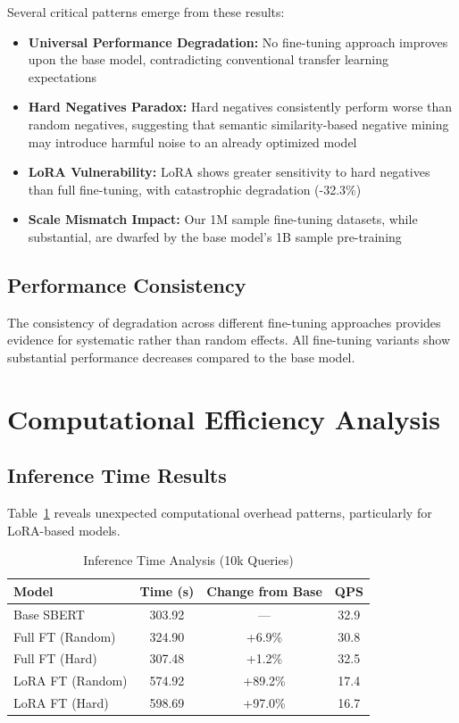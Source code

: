 Several critical patterns emerge from these results:

\begin{itemize}
\item \textbf{Universal Performance Degradation:} No fine-tuning approach improves upon the base model, contradicting conventional transfer learning expectations
\item \textbf{Hard Negatives Paradox:} Hard negatives consistently perform worse than random negatives, suggesting that semantic similarity-based negative mining may introduce harmful noise to an already optimized model
\item \textbf{LoRA Vulnerability:} LoRA shows greater sensitivity to hard negatives than full fine-tuning, with catastrophic degradation (-32.3\%)
\item \textbf{Scale Mismatch Impact:} Our 1M sample fine-tuning datasets, while substantial, are dwarfed by the base model's 1B sample pre-training
\end{itemize}

\subsection{Performance Consistency}

The consistency of degradation across different fine-tuning approaches provides evidence for systematic rather than random effects. All fine-tuning variants show substantial performance decreases compared to the base model.

\section{Computational Efficiency Analysis}

\subsection{Inference Time Results}

Table~\ref{tab:inference_detailed_thesis} reveals unexpected computational overhead patterns, particularly for LoRA-based models.

\begin{table}[h]
\centering
\caption{Inference Time Analysis (10k Queries)}
\label{tab:inference_detailed_thesis}
\begin{tabular}{lccc}
\toprule
Model & Time (s) & Change from Base & QPS \\
\midrule
Base SBERT & 303.92 & — & 32.9 \\
Full FT (Random) & 324.90 & +6.9\% & 30.8 \\
Full FT (Hard) & 307.48 & +1.2\% & 32.5 \\
LoRA FT (Random) & 574.92 & +89.2\% & 17.4 \\
LoRA FT (Hard) & 598.69 & +97.0\% & 16.7 \\
\bottomrule
\end{tabular}
\end{table}

